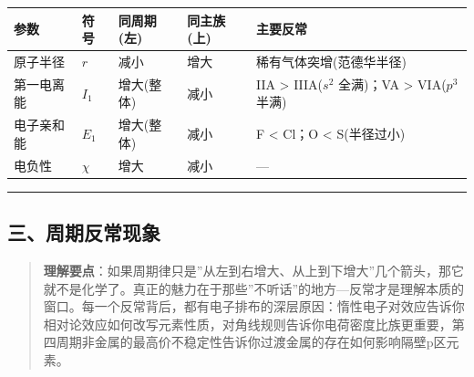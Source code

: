 {\def\LTcaptype{none} %
\begin{longtable}[]{@{}
  >{\raggedright\arraybackslash}p{}
  >{\centering\arraybackslash}p{}
  >{\centering\arraybackslash}p{}
  >{\centering\arraybackslash}p{}
  >{\raggedright\arraybackslash}p{}@{}}
\toprule\noalign{}
\begin{minipage}[b]{\linewidth}\raggedright
参数
\end{minipage} & \begin{minipage}[b]{\linewidth}\centering
符号
\end{minipage} & \begin{minipage}[b]{\linewidth}\centering
同周期(左)
\end{minipage} & \begin{minipage}[b]{\linewidth}\centering
同主族(上)
\end{minipage} & \begin{minipage}[b]{\linewidth}\raggedright
主要反常
\end{minipage} \\
\midrule\noalign{}
\endhead
\bottomrule\noalign{}
\endlastfoot
原子半径 & \(r\) &  减小 &  增大 & 稀有气体突增(范德华半径) \\
第一电离能 & \(I_1\) &  增大(整体) &  减小 & IIA \textgreater{} IIIA(\(s^2\) 全满)；VA \textgreater{} VIA(\(p^3\) 半满) \\
电子亲和能 & \(E_1\) &  增大(整体) &  减小 & F \textless{} Cl；O \textless{} S(半径过小) \\
电负性 & \(\chi\) &  增大 &  减小 & --- \\
\end{longtable}
}

\begin{center}\rule{0.5\linewidth}{0.5pt}\end{center}

\subsection{三、周期反常现象}\label{ux4e09ux5468ux671fux53cdux5e38ux73b0ux8c61}

\begin{quote}
\textbf{理解要点}：如果周期律只是''从左到右增大、从上到下增大''几个箭头，那它就不是化学了。真正的魅力在于那些''不听话''的地方---反常才是理解本质的窗口。每一个反常背后，都有电子排布的深层原因：惰性电子对效应告诉你相对论效应如何改写元素性质，对角线规则告诉你电荷密度比族更重要，第四周期非金属的最高价不稳定性告诉你过渡金属的存在如何影响隔壁p区元素。
\end{quote}


